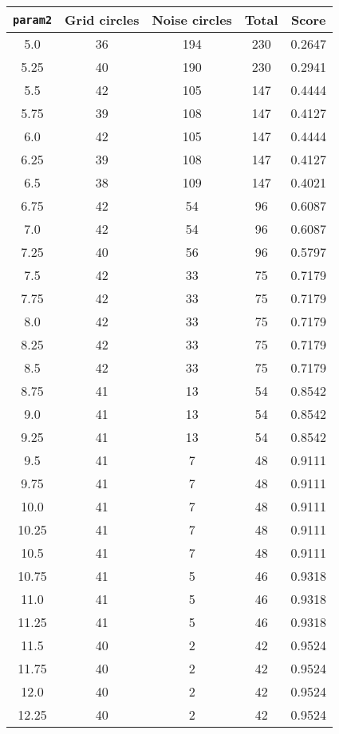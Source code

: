 \documentclass[letterpaper, 12pt]{article}
\begin{document}
\begin{longtable}{|c|c|c|c|c|}
\hline
\textbf{\texttt{param2}} & \textbf{Grid circles} & \textbf{Noise circles} & \textbf{Total} & \textbf{Score} \\
\hline
5.0 & 36 & 194 & 230 & 0.2647 \\
\hline
5.25 & 40 & 190 & 230 & 0.2941 \\
\hline
5.5 & 42 & 105 & 147 & 0.4444 \\
\hline
5.75 & 39 & 108 & 147 & 0.4127 \\
\hline
6.0 & 42 & 105 & 147 & 0.4444 \\
\hline
6.25 & 39 & 108 & 147 & 0.4127 \\
\hline
6.5 & 38 & 109 & 147 & 0.4021 \\
\hline
6.75 & 42 & 54 & 96 & 0.6087 \\
\hline
7.0 & 42 & 54 & 96 & 0.6087 \\
\hline
7.25 & 40 & 56 & 96 & 0.5797 \\
\hline
7.5 & 42 & 33 & 75 & 0.7179 \\
\hline
7.75 & 42 & 33 & 75 & 0.7179 \\
\hline
8.0 & 42 & 33 & 75 & 0.7179 \\
\hline
8.25 & 42 & 33 & 75 & 0.7179 \\
\hline
8.5 & 42 & 33 & 75 & 0.7179 \\
\hline
8.75 & 41 & 13 & 54 & 0.8542 \\
\hline
9.0 & 41 & 13 & 54 & 0.8542 \\
\hline
9.25 & 41 & 13 & 54 & 0.8542 \\
\hline
9.5 & 41 & 7 & 48 & 0.9111 \\
\hline
9.75 & 41 & 7 & 48 & 0.9111 \\
\hline
10.0 & 41 & 7 & 48 & 0.9111 \\
\hline
10.25 & 41 & 7 & 48 & 0.9111 \\
\hline
10.5 & 41 & 7 & 48 & 0.9111 \\
\hline
10.75 & 41 & 5 & 46 & 0.9318 \\
\hline
11.0 & 41 & 5 & 46 & 0.9318 \\
\hline
11.25 & 41 & 5 & 46 & 0.9318 \\
\hline
11.5 & 40 & 2 & 42 & 0.9524 \\
\hline
11.75 & 40 & 2 & 42 & 0.9524 \\
\hline
12.0 & 40 & 2 & 42 & 0.9524 \\
\hline
12.25 & 40 & 2 & 42 & 0.9524 \\
\hline

\end{longtable}
\end{document}

